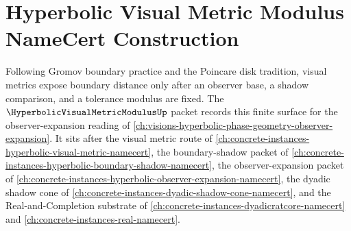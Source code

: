 \chapter{Hyperbolic Visual Metric Modulus NameCert Construction}
\label{ch:concrete-instances-hyperbolic-visual-metric-modulus-namecert}

Following Gromov boundary practice and the Poincare disk tradition, visual metrics expose boundary distance only after an observer base, a shadow comparison, and a tolerance modulus are fixed. The $\HyperbolicVisualMetricModulusUp$ packet records this finite surface for the observer-expansion reading of \autoref{ch:visions-hyperbolic-phase-geometry-observer-expansion}. It sits after the visual metric route of \autoref{ch:concrete-instances-hyperbolic-visual-metric-namecert}, the boundary-shadow packet of \autoref{ch:concrete-instances-hyperbolic-boundary-shadow-namecert}, the observer-expansion packet of \autoref{ch:concrete-instances-hyperbolic-observer-expansion-namecert}, the dyadic shadow cone of \autoref{ch:concrete-instances-dyadic-shadow-cone-namecert}, and the Real-and-Completion substrate of \autoref{ch:concrete-instances-dyadicratcore-namecert} and \autoref{ch:concrete-instances-real-namecert}.


